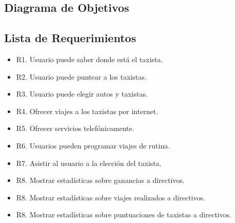 \subsection{Diagrama de Objetivos}
\subsection{Lista de Requerimientos}
	\begin{itemize}
		\item R1. Usuario puede saber donde está el taxista.
		\item R2. Usuario puede puntear a los taxistas.
		\item R3. Usuario puede elegir autos y taxistas.
		\item R4. Ofrecer viajes a los taxistas por internet.
		\item R5. Ofrecer servicios telefónicamente.
		\item R6. Usuarios pueden programar viajes de rutina.
		\item R7. Asistir al usuario a la elección del taxista.
		\item R8. Mostrar estadísticas sobre ganancias a directivos.
		\item R8. Mostrar estadísticas sobre viajes realizados a directivos.
		\item R8. Mostrar estadísticas sobre puntuaciones de taxistas a directivos.
	
	\end{itemize}
